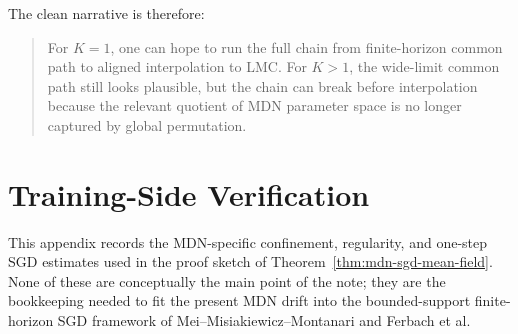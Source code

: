 \documentclass[11pt]{article}
\theoremstyle{definition}
\begin{document}
The clean narrative is therefore:
\begin{quote}
For $K=1$, one can hope to run the full chain from finite-horizon common path to
aligned interpolation to LMC. For $K>1$, the wide-limit common path still looks
plausible, but the chain can break before interpolation because the relevant
quotient of MDN parameter space is no longer captured by global permutation.
\end{quote}

\appendix

\section{Training-Side Verification}
\label{app:training-verification}

This appendix records the MDN-specific confinement, regularity, and one-step SGD
estimates used in the proof sketch of
Theorem~\ref{thm:mdn-sgd-mean-field}. None of these are conceptually the main
point of the note; they are the bookkeeping needed to fit the present MDN drift
into the bounded-support finite-horizon SGD framework of
Mei--Misiakiewicz--Montanari and Ferbach et al.
\end{document}
